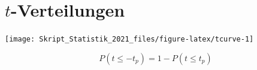 \documentclass[
  11pt,
  ngerman,
  a4paper,
]{report}
\begin{document}
\pagebreak

\hypertarget{tabelle-t}{%
\section*{\texorpdfstring{\(t\)-Verteilungen}{t-Verteilungen}}\label{tabelle-t}}

\begin{multicols}{2}
\vfill


\begin{center}\texttt{[image: Skript\_Statistik\_2021\_files/figure-latex/tcurve-1]} \end{center}

\vfill
\columnbreak
\vfill
\[ P(t\leq -t_p)= 1 - P(t\leq t_p) \]
\vfill
\end{multicols}
\end{document}
